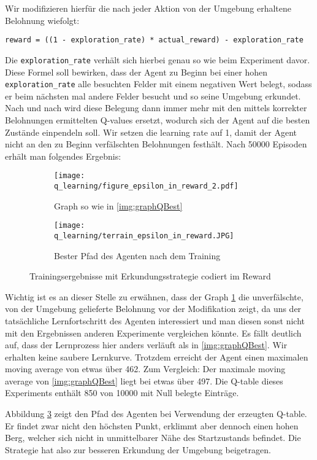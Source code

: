 Wir modifizieren hierfür die nach jeder Aktion von der Umgebung erhaltene Belohnung wiefolgt:
\begin{verbatim}
reward = ((1 - exploration_rate) * actual_reward) - exploration_rate
\end{verbatim}
Die \texttt{exploration_rate} verhält sich hierbei genau so wie beim Experiment davor. Diese Formel soll bewirken, dass der Agent zu Beginn bei einer hohen \texttt{exploration_rate} alle besuchten Felder mit einem negativen Wert belegt, sodass er beim nächsten mal andere Felder besucht und so seine Umgebung erkundet. Nach und nach wird diese Belegung dann immer mehr mit den mittels korrekter Belohnungen ermittelten Q-values ersetzt, wodurch sich der Agent auf die besten Zustände einpendeln soll. Wir setzen die learning rate auf 1, damit der Agent nicht an den zu Beginn verfälschten Belohnungen festhält. Nach 50000 Episoden erhält man folgendes Ergebnis:
\begin{figure}[H]
    \centering
    \begin{subfigure}[b]{0.49\textwidth}
        \texttt{[image: q\_learning/figure\_epsilon\_in\_reward\_2.pdf]}
        \caption{Graph so wie in \ref{img:graphQBest}}
        \label{img:graphQEpsInRew}
    \end{subfigure}
    \begin{subfigure}[b]{0.49\textwidth}
        \texttt{[image: q\_learning/terrain\_epsilon\_in\_reward.JPG]}
        \caption{Bester Pfad des Agenten nach dem Training}
        \label{img:pathQEpsInRew}
    \end{subfigure}
    \caption{Trainingsergebnisse mit Erkundungsstrategie codiert im Reward}
\end{figure}
Wichtig ist es an dieser Stelle zu erwähnen, dass der Graph \ref{img:graphQEpsInRew} die unverfälschte, von der Umgebung gelieferte Belohnung vor der Modifikation zeigt, da uns der tatsächliche Lernfortschritt des Agenten interessiert und man diesen sonst nicht mit den Ergebnissen anderen Experimente vergleichen könnte. Es fällt deutlich auf, dass der Lernprozess hier anders verläuft als in \ref{img:graphQBest}. Wir erhalten keine saubere Lernkurve. Trotzdem erreicht der Agent einen maximalen moving average von etwas über 462. Zum Vergleich: Der maximale moving average von \ref{img:graphQBest} liegt bei etwas über 497. Die Q-table dieses Experiments enthält 850 von 10000 mit Null belegte Einträge.

Abbildung \ref{img:pathQEpsInRew} zeigt den Pfad des Agenten bei Verwendung der erzeugten Q-table. Er findet zwar nicht den höchsten Punkt, erklimmt aber dennoch einen hohen Berg, welcher sich nicht in unmittelbarer Nähe des Startzustands befindet. Die Strategie hat also zur besseren Erkundung der Umgebung beigetragen.

